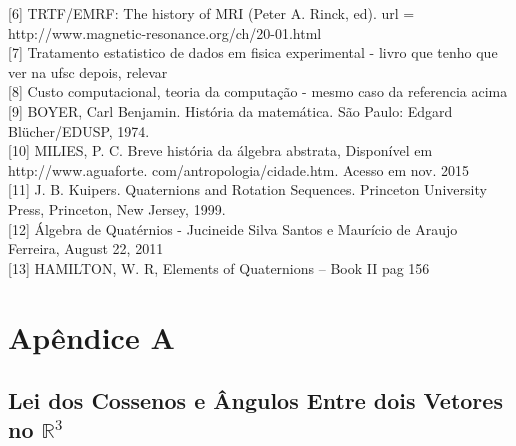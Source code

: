 \documentclass[a4paper,12pt]{article}
\begin{document}
	[6] TRTF/EMRF: The history of MRI (Peter A. Rinck, ed). url = http://www.magnetic-resonance.org/ch/20-01.html
	\\
	
	[7] Tratamento estatistico de dados em fisica experimental - livro que tenho que ver na ufsc depois, relevar
	\\
	
	[8] Custo computacional, teoria da computação - mesmo caso da referencia acima
	\\
	
	[9] BOYER, Carl Benjamin. História da matemática. São Paulo: Edgard Blücher/EDUSP, 1974.
	\\
	
	[10] MILIES, P. C. Breve história da álgebra abstrata, Disponível em http://www.aguaforte. com/antropologia/cidade.htm. Acesso em nov. 2015
	\\
	
	[11] J. B. Kuipers. Quaternions and Rotation Sequences. Princeton University Press, Princeton, New Jersey, 1999. 
	\\
	
	[12] Álgebra de Quatérnios - Jucineide Silva Santos e Maurício de Araujo Ferreira, August 22, 2011
	\\
	
	[13] HAMILTON, W. R, Elements of Quaternions – Book II pag 156 %
	
	\newpage
	\section*{Apêndice A}
	\subsection*{Lei dos Cossenos e Ângulos Entre dois Vetores no $\mathbb{R}^3$}
	
\end{document}
